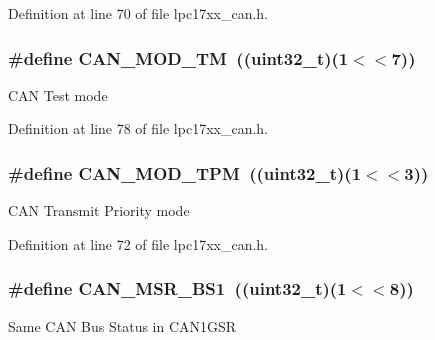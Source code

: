 \-Definition at line 70 of file lpc17xx\-\_\-can.\-h.

\hypertarget{group___c_a_n___private___macros_ga0fc0c3414f4f0e4166e90e271631d89b}{
\subsubsection[{\-C\-A\-N\-\_\-\-M\-O\-D\-\_\-\-T\-M}]{\setlength{\rightskip}{0pt plus 5cm}\#define {\bf \-C\-A\-N\-\_\-\-M\-O\-D\-\_\-\-T\-M}~((uint32\-\_\-t)(1$<$$<$7))}}\label{group___c_a_n___private___macros_ga0fc0c3414f4f0e4166e90e271631d89b}
\-C\-A\-N \-Test mode 

\-Definition at line 78 of file lpc17xx\-\_\-can.\-h.

\hypertarget{group___c_a_n___private___macros_gad8795757b9206a4daee0f5a40517385f}{
\subsubsection[{\-C\-A\-N\-\_\-\-M\-O\-D\-\_\-\-T\-P\-M}]{\setlength{\rightskip}{0pt plus 5cm}\#define {\bf \-C\-A\-N\-\_\-\-M\-O\-D\-\_\-\-T\-P\-M}~((uint32\-\_\-t)(1$<$$<$3))}}\label{group___c_a_n___private___macros_gad8795757b9206a4daee0f5a40517385f}
\-C\-A\-N \-Transmit \-Priority mode 

\-Definition at line 72 of file lpc17xx\-\_\-can.\-h.

\hypertarget{group___c_a_n___private___macros_gabcc3d8a6efc53e7e6ef395d873106b4a}{
\subsubsection[{\-C\-A\-N\-\_\-\-M\-S\-R\-\_\-\-B\-S1}]{\setlength{\rightskip}{0pt plus 5cm}\#define {\bf \-C\-A\-N\-\_\-\-M\-S\-R\-\_\-\-B\-S1}~((uint32\-\_\-t)(1$<$$<$8))}}\label{group___c_a_n___private___macros_gabcc3d8a6efc53e7e6ef395d873106b4a}
\-Same \-C\-A\-N \-Bus \-Status in \-C\-A\-N1\-G\-S\-R 

